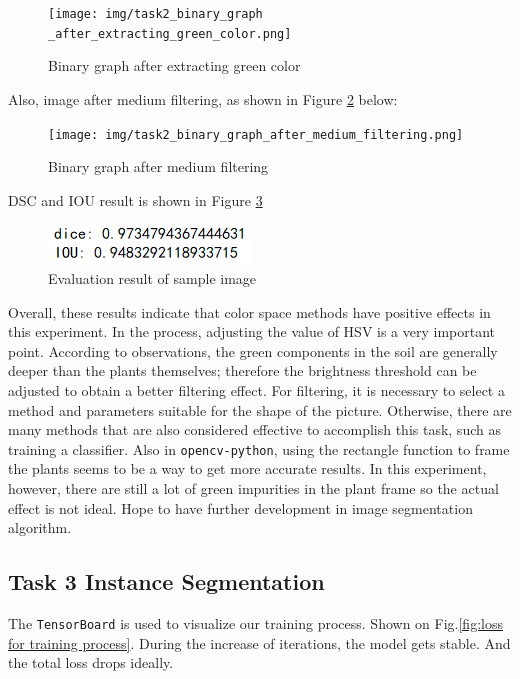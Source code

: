 \documentclass[conference]{IEEEtran}
\begin{document}
\begin{figure}[h!]
\centering
\texttt{[image: img/task2\_binary\_graph \_after\_extracting\_green\_color.png]}
\caption{Binary graph after extracting green color}
\label{task2_binary_graph_after_extracting_green_color}
\end{figure}
Also, image after medium filtering, as shown in Figure \ref{task2_binary_graph_after_medium_filtering} below:

\begin{figure}[h!]
\centering
\texttt{[image: img/task2\_binary\_graph\_after\_medium\_filtering.png]}
\caption{Binary graph after medium filtering}
\label{task2_binary_graph_after_medium_filtering}
\end{figure}
DSC and IOU result is shown in Figure \ref{task2_dice_and_iou}

\begin{figure}[h!]
\centering
\includegraphics[width=0.5\linewidth]{img/task2_dice_and_iou.png}
\caption{Evaluation result of sample image}
\label{task2_dice_and_iou}
\end{figure}

Overall, these results indicate that color space methods have positive effects in this experiment. In the process, adjusting the value of HSV is a very important point. According to observations, the green components in the soil are generally deeper than the plants themselves; therefore the brightness threshold can be adjusted to obtain a better filtering effect. For filtering, it is necessary to select a method and parameters suitable for the shape of the picture. Otherwise, there are many methods that are also considered effective to accomplish this task, such as training a classifier. Also in \verb|opencv-python|, using the rectangle function to frame the plants seems to be a way to get more accurate results. In this experiment, however, there are still a lot of green impurities in the plant frame so the actual effect is not ideal. Hope to have further development in image segmentation algorithm.

\subsection{Task 3 Instance Segmentation}

The \verb|TensorBoard| is used to visualize our training process.
Shown on Fig.\ref{fig:loss for training process}.
During the increase of iterations, the model gets stable.
And the total loss drops ideally.
\end{document}
